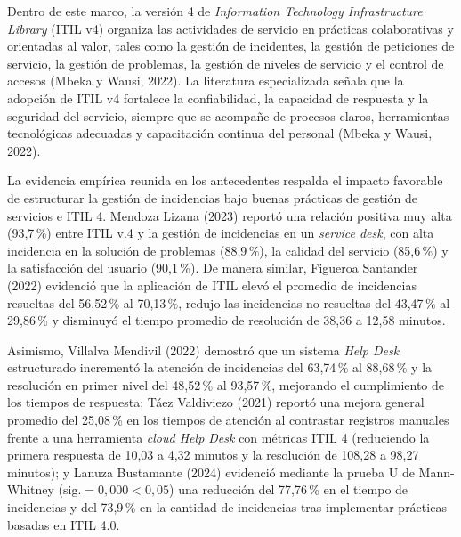 Dentro de este marco, la versión 4 de \textit{Information Technology Infrastructure Library} (ITIL v4) organiza las actividades de servicio en prácticas colaborativas y orientadas al valor, tales como la gestión de incidentes, la gestión de peticiones de servicio, la gestión de problemas, la gestión de niveles de servicio y el control de accesos (Mbeka y Wausi, 2022). La literatura especializada señala que la adopción de ITIL v4 fortalece la confiabilidad, la capacidad de respuesta y la seguridad del servicio, siempre que se acompañe de procesos claros, herramientas tecnológicas adecuadas y capacitación continua del personal (Mbeka y Wausi, 2022).

La evidencia empírica reunida en los antecedentes respalda el impacto favorable de estructurar la gestión de incidencias bajo buenas prácticas de gestión de servicios e ITIL 4. Mendoza Lizana (2023) reportó una relación positiva muy alta (93,7\,\%) entre ITIL v.4 y la gestión de incidencias en un \textit{service desk}, con alta incidencia en la solución de problemas (88,9\,\%), la calidad del servicio (85,6\,\%) y la satisfacción del usuario (90,1\,\%). De manera similar, Figueroa Santander (2022) evidenció que la aplicación de ITIL elevó el promedio de incidencias resueltas del 56,52\,\% al 70,13\,\%, redujo las incidencias no resueltas del 43,47\,\% al 29,86\,\% y disminuyó el tiempo promedio de resolución de 38,36 a 12,58 minutos.

Asimismo, Villalva Mendivil (2022) demostró que un sistema \textit{Help Desk} estructurado incrementó la atención de incidencias del 63,74\,\% al 88,68\,\% y la resolución en primer nivel del 48,52\,\% al 93,57\,\%, mejorando el cumplimiento de los tiempos de respuesta; Táez Valdiviezo (2021) reportó una mejora general promedio del 25,08\,\% en los tiempos de atención al contrastar registros manuales frente a una herramienta \textit{cloud Help Desk} con métricas ITIL 4 (reduciendo la primera respuesta de 10,03 a 4,32 minutos y la resolución de 108,28 a 98,27 minutos); y Lanuza Bustamante (2024) evidenció mediante la prueba U de Mann-Whitney ($\text{sig.} = 0,000 < 0,05$) una reducción del 77,76\,\% en el tiempo de incidencias y del 73,9\,\% en la cantidad de incidencias tras implementar prácticas basadas en ITIL 4.0.

\vspace{0.6em}

